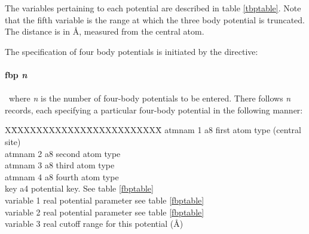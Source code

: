 \noindent The variables pertaining to each potential are described in table
\ref{tbptable}. Note that the fifth variable is the range at which
the three body potential is truncated. The distance is in \AA,
measured from the central atom.

The specification of four body potentials is initiated by the directive:

\paragraph*{fbp {\em n}}
\paragraph*{}

\noindent
~where {\em n} is the number of four-body potentials to be entered. There
follows {\em n} records, each specifying a particular four-body potential
in the following manner:

\begin{tabbing}
X\=XXXXXXXXXXXX\=XXXXXXXXXXXX\=\kill
\> atmnam 1 \> a8 \> first atom type (central site)\\
\> atmnam 2 \> a8 \> second atom type\\
\> atmnam 3 \> a8 \> third atom type\\
\> atmnam 4 \> a8 \> fourth atom type\\
\> key \> a4 \> potential key. See table \ref{fbptable}\\
\> variable 1 \> real \> potential parameter see table
\ref{fbptable}\\
\> variable 2 \> real \> potential parameter see table
\ref{fbptable}\\
\> variable 3 \> real \> cutoff range for this potential (\AA)\\
\end{tabbing}

